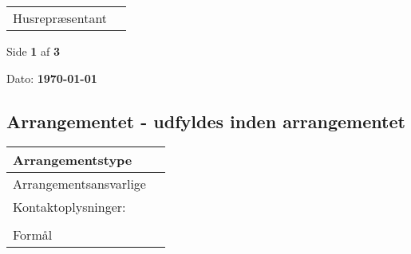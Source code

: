 \documentclass[a4paper, 11pt]{article}
\begin{document}
{{{{{{{{{{{{\begin{tabular}{|l|l|}
\begin{minipage}[t]{0.475\textwidth}
    \end{minipage} \\
    \hline
    \begin{minipage}[t]{0.475\textwidth}
        Husrepræsentant
        \newline
    \end{minipage} &
    \begin{minipage}[t]{0.475\textwidth}

    \end{minipage} \\
    \hline
\end{tabular}

\vfill

\begin{center}
    Side \textbf{1} af \textbf{3}
\end{center}

\newpage


\noindent
\small{Dato: \textbf{\today} }

\subsection*{Arrangementet - udfyldes inden arrangementet}

\begin{tabular}{|l|l|}
    \hline
    \begin{minipage}[t]{0.475\textwidth}
        Arrangementstype
        \newline
    \end{minipage} &
    \begin{minipage}[t]{0.475\textwidth}

    \end{minipage} \\
    \hline
    \begin{minipage}[t]{0.475\textwidth}
        Arrangementsansvarlige
        \newline
    \end{minipage} &
    \begin{minipage}[t]{0.475\textwidth}
        Navn: \\
        Kontaktoplysninger: \\
    \end{minipage} \\
    \hline
    \begin{minipage}[t]{0.475\textwidth}
        Formål
        \newline
    \end{minipage} &
    \begin{minipage}[t]{0.475\textwidth}


\end{minipage}
\end{tabular}}}}}}}}}}}}}
\end{document}
